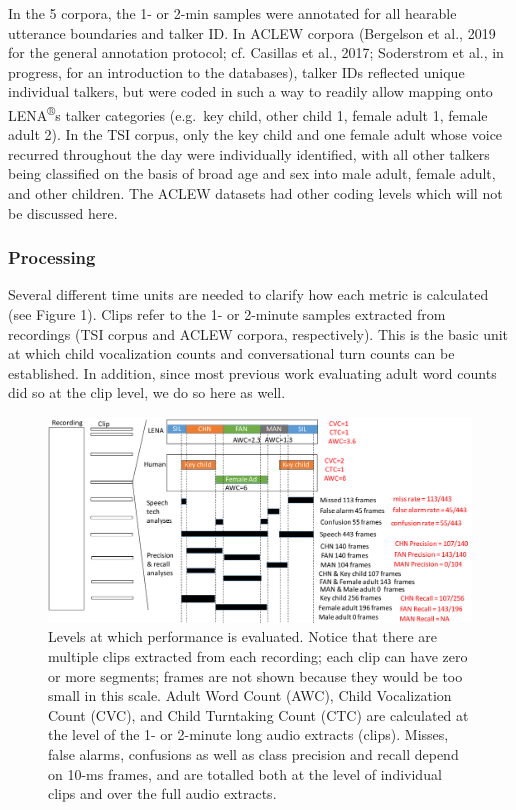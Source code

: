 \documentclass[english,table,man,floatsintext]{apa6}
\begin{document}
In the 5 corpora, the 1- or 2-min samples were annotated for all
hearable utterance boundaries and talker ID. In ACLEW corpora (Bergelson
et al., 2019 for the general annotation protocol; cf. Casillas et al.,
2017; Soderstrom et al., in progress, for an introduction to the
databases), talker IDs reflected unique individual talkers, but were
coded in such a way to readily allow mapping onto
LENA\textsuperscript{®}s talker categories (e.g.~key child, other child
1, female adult 1, female adult 2). In the TSI corpus, only the key
child and one female adult whose voice recurred throughout the day were
individually identified, with all other talkers being classified on the
basis of broad age and sex into male adult, female adult, and other
children. The ACLEW datasets had other coding levels which will not be
discussed here.

\subsubsection{Processing}\label{processing}

Several different time units are needed to clarify how each metric is
calculated (see Figure 1). Clips refer to the 1- or 2-minute samples
extracted from recordings (TSI corpus and ACLEW corpora, respectively).
This is the basic unit at which child vocalization counts and
conversational turn counts can be established. In addition, since most
previous work evaluating adult word counts did so at the clip level, we
do so here as well.

\begin{figure}
\centering
\includegraphics{fig_levels.pdf}
\caption{Levels at which performance is evaluated. Notice that there are
multiple clips extracted from each recording; each clip can have zero or
more segments; frames are not shown because they would be too small in
this scale. Adult Word Count (AWC), Child Vocalization Count (CVC), and
Child Turntaking Count (CTC) are calculated at the level of the 1- or
2-minute long audio extracts (clips). Misses, false alarms, confusions
as well as class precision and recall depend on 10-ms frames, and are
totalled both at the level of individual clips and over the full audio
extracts.}
\end{figure}
\end{document}
